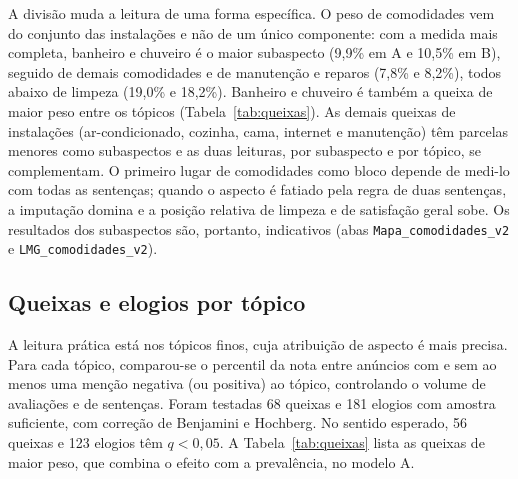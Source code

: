 A divisão muda a leitura de uma forma específica. O peso de comodidades vem do conjunto das instalações e não de um único componente: com a medida mais completa, banheiro e chuveiro é o maior subaspecto (9,9\% em A e 10,5\% em B), seguido de demais comodidades e de manutenção e reparos (7,8\% e 8,2\%), todos abaixo de limpeza (19,0\% e 18,2\%). Banheiro e chuveiro é também a queixa de maior peso entre os tópicos (Tabela~\ref{tab:queixas}). As demais queixas de instalações (ar-condicionado, cozinha, cama, internet e manutenção) têm parcelas menores como subaspectos e as duas leituras, por subaspecto e por tópico, se complementam. O primeiro lugar de comodidades como bloco depende de medi-lo com todas as sentenças; quando o aspecto é fatiado pela regra de duas sentenças, a imputação domina e a posição relativa de limpeza e de satisfação geral sobe. Os resultados dos subaspectos são, portanto, indicativos (abas \texttt{Mapa\_comodidades\_v2} e \texttt{LMG\_comodidades\_v2}).

\subsection{Queixas e elogios por tópico}

A leitura prática está nos tópicos finos, cuja atribuição de aspecto é mais precisa. Para cada tópico, comparou-se o percentil da nota entre anúncios com e sem ao menos uma menção negativa (ou positiva) ao tópico, controlando o volume de avaliações e de sentenças. Foram testadas 68 queixas e 181 elogios com amostra suficiente, com correção de Benjamini e Hochberg. No sentido esperado, 56 queixas e 123 elogios têm $q < 0{,}05$. A Tabela~\ref{tab:queixas} lista as queixas de maior peso, que combina o efeito com a prevalência, no modelo A.

